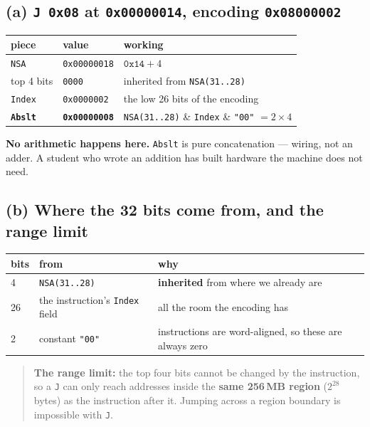 \documentclass[11pt]{article}
\newcommand{\code}[1]{\texttt{#1}}
\begin{document}
\subsection*{(a) \code{J 0x08} at \code{0x00000014}, encoding \code{0x08000002}}

\begin{center}
\begin{tabular}{lll}
\toprule
piece & value & working \\
\midrule
\code{NSA} & \code{0x00000018} & $\code{0x14} + 4$ \\
top 4 bits & \code{0000} & inherited from \code{NSA(31..28)} \\
\code{Index} & \code{0x0000002} & the low 26 bits of the encoding \\
\textbf{\code{Abslt}} & \textbf{\code{0x00000008}} & \code{NSA(31..28)} \& \code{Index} \& \code{"00"} $= 2 \times 4$ \\
\bottomrule
\end{tabular}
\end{center}

\textbf{No arithmetic happens here.} \code{Abslt} is pure concatenation --- wiring,
not an adder. A student who wrote an addition has built hardware the machine does
not need.

\subsection*{(b) Where the 32 bits come from, and the range limit}

\begin{center}
\begin{tabular}{lll}
\toprule
bits & from & why \\
\midrule
4 & \code{NSA(31..28)} & \textbf{inherited} from where we already are \\
26 & the instruction's \code{Index} field & all the room the encoding has \\
2 & constant \code{"00"} & instructions are word-aligned, so these are always zero \\
\bottomrule
\end{tabular}
\end{center}

\begin{quote}
\textbf{The range limit:} the top four bits cannot be changed by the instruction,
so a \code{J} can only reach addresses inside the \textbf{same 256\,MB region}
($2^{28}$ bytes) as the instruction after it. Jumping across a region boundary is
impossible with \code{J}.
\end{quote}
\end{document}
